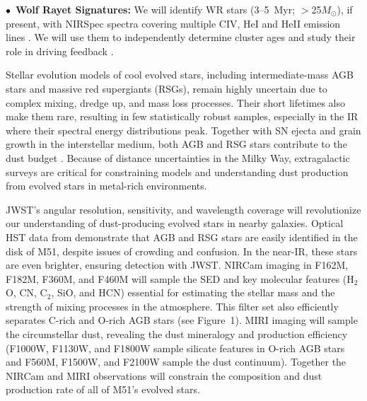 \documentclass[12pt]{article}
\newenvironment{parhang}{\hangafter=1\hangindent=10pt}{\par}
\begin{document}
    \begin{parhang}
    \noindent
    $\bullet$~{\bf Wolf Rayet Signatures:} We will identify WR stars (3--5~Myr; $>$25$M_\odot$), if present, with NIRSpec spectra  covering multiple C{\small IV}, He{\small I} and He{\small II} emission lines \citep{pasquali2002,kanarek2017}. We will use them to independently determine cluster ages and study their role in driving feedback \citep[e.g.,][]{sokal2016}. 
    \end{parhang}

\vspace{0.2\baselineskip}
 Stellar evolution models of cool evolved stars, including intermediate-mass AGB stars and massive red supergiants (RSGs), remain highly uncertain due to complex mixing, dredge up, and mass loss processes. Their short lifetimes also make them rare, resulting in few statistically robust samples, especially in the IR where their spectral energy distributions peak. Together with SN ejecta and grain growth in the interstellar medium, both AGB and RSG stars contribute to the dust budget \citep{matsuura2009,boyer2012,srinivasan2016}. Because of distance uncertainties in the Milky Way,  extragalactic surveys are critical for constraining models and understanding dust production from evolved stars in metal-rich environments. 

JWST's angular resolution, sensitivity, and wavelength coverage will revolutionize our understanding of dust-producing evolved stars in nearby galaxies. Optical HST data from \citet{mcquinn2016} demonstrate that AGB and RSG stars are easily identified in the disk of M51, despite issues of crowding and confusion. In the near-IR, these stars are even brighter, ensuring detection with JWST. NIRCam imaging in F162M, F182M, F360M, and F460M will sample the SED and key molecular features  (H$_2$O, CN, C$_2$, SiO, and HCN) essential for estimating the stellar mass and the strength of mixing processes in the atmosphere. This filter set also efficiently separates C-rich and O-rich AGB stars (see Figure~1). MIRI imaging will sample the circumstellar dust, revealing the dust mineralogy and production efficiency (F1000W, F1130W, and F1800W sample silicate features in O-rich AGB stars and F560M, F1500W, and F2100W sample the dust continuum). Together the NIRCam and MIRI observations will constrain the composition and dust production rate of all of M51's evolved stars.
\end{document}

